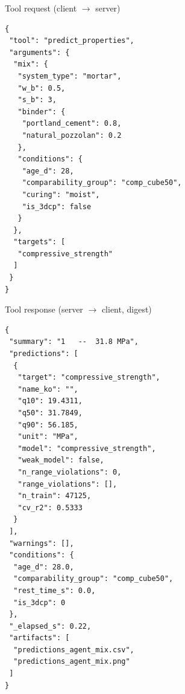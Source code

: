 \begin{mcpbox}{Tool request (client $\rightarrow$ server)}
\begin{lstlisting}[style=jsonstyle]
{
 "tool": "predict_properties",
 "arguments": {
  "mix": {
   "system_type": "mortar",
   "w_b": 0.5,
   "s_b": 3,
   "binder": {
    "portland_cement": 0.8,
    "natural_pozzolan": 0.2
   },
   "conditions": {
    "age_d": 28,
    "comparability_group": "comp_cube50",
    "curing": "moist",
    "is_3dcp": false
   }
  },
  "targets": [
   "compressive_strength"
  ]
 }
}
\end{lstlisting}
\end{mcpbox}
\begin{mcpbox}{Tool response (server $\rightarrow$ client, digest)}
\begin{lstlisting}[style=jsonstyle]
{
 "summary": "1   --  31.8 MPa",
 "predictions": [
  {
   "target": "compressive_strength",
   "name_ko": "",
   "q10": 19.4311,
   "q50": 31.7849,
   "q90": 56.185,
   "unit": "MPa",
   "model": "compressive_strength",
   "weak_model": false,
   "n_range_violations": 0,
   "range_violations": [],
   "n_train": 47125,
   "cv_r2": 0.5333
  }
 ],
 "warnings": [],
 "conditions": {
  "age_d": 28.0,
  "comparability_group": "comp_cube50",
  "rest_time_s": 0.0,
  "is_3dcp": 0
 },
 "_elapsed_s": 0.22,
 "artifacts": [
  "predictions_agent_mix.csv",
  "predictions_agent_mix.png"
 ]
}
\end{lstlisting}
\end{mcpbox}